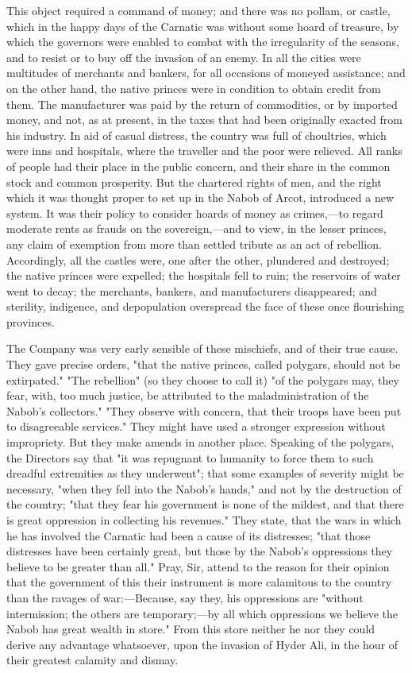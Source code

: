 This object required a command of money; and there was no pollam, or castle, which in the happy days of the Carnatic was without some hoard of treasure, by which the governors were enabled to combat with the irregularity of the seasons, and to resist or to buy off the invasion of an enemy. In all the cities were multitudes of merchants and bankers, for all occasions of moneyed assistance; and on the other hand, the native princes were in condition to obtain credit from them. The manufacturer was paid by the return of commodities, or by imported money, and not, as at present, in the taxes that had been originally exacted from his industry. In aid of casual distress, the country was full of choultries, which were inns and hospitals, where the traveller and the poor were relieved. All ranks of people had their place in the public concern, and their share in the common stock and common prosperity. But the chartered rights of men, and the right which it was thought proper to set up in the Nabob of Arcot, introduced a new system. It was their policy to consider hoards of money as crimes,—to regard moderate rents as frauds on the sovereign,—and to view, in the lesser princes, any claim of exemption from more than settled tribute as an act of rebellion. Accordingly, all the castles were, one after the other, plundered and destroyed; the native princes were expelled; the hospitals fell to ruin; the reservoirs of water went to decay; the merchants, bankers, and manufacturers disappeared; and sterility, indigence, and depopulation overspread the face of these once flourishing provinces.

The Company was very early sensible of these mischiefs, and of their true cause. They gave precise orders, "that the native princes, called polygars, should not be extirpated." "The rebellion" (so they choose to call it) "of the polygars may, they fear, with, too much justice, be attributed to the maladministration of the Nabob's collectors." "They observe with concern, that their troops have been put to disagreeable services." They might have used a stronger expression without impropriety. But they make amends in another place. Speaking of the polygars, the Directors say that "it was repugnant to humanity to force them to such dreadful extremities as they underwent"; that some examples of severity might be necessary, "when they fell into the Nabob's hands," and not by the destruction of the country; "that they fear his government is none of the mildest, and that there is great oppression in collecting his revenues." They state, that the wars in which he has involved the Carnatic had been a cause of its distresses; "that those distresses have been certainly great, but those by the Nabob's oppressions they believe to be greater than all." Pray, Sir, attend to the reason for their opinion that the government of this their instrument is more calamitous to the country than the ravages of war:—Because, say they, his oppressions are "without intermission; the others are temporary;—by all which oppressions we believe the Nabob has great wealth in store." From this store neither he nor they could derive any advantage whatsoever, upon the invasion of Hyder Ali, in the hour of their greatest calamity and dismay.

